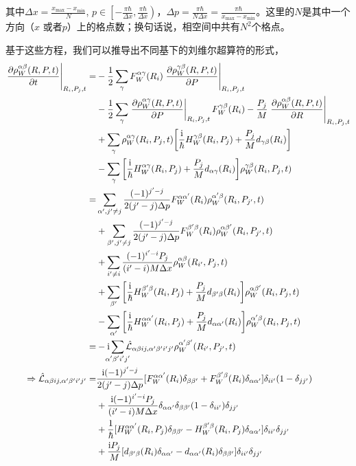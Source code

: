 \documentclass[UTF8,12pt]{article}
\begin{document}
        其中$\Delta x=\frac{x_{\max}-x_{\min}}{N}$, $p\in\left[-\frac{\pi\hbar}{\Delta x},\frac{\pi\hbar}{\Delta x}\right)$，$\Delta p=\frac{\pi\hbar}{N\Delta x}=\frac{\pi\hbar}{x_{\max}-x_{\min}}$。这里的$N$是其中一个方向（$x$ 或者$p$）上的格点数；换句话说，相空间中共有$N^2$个格点。\par
        基于这些方程，我们可以推导出不同基下的刘维尔超算符的形式，
        \begin{align}
            \eval{\pdv{\rho_W^{\alpha\beta}(R,P,t)}{t}}_{R_i,P_j,t}=&-\frac{1}{2}\sum_{\gamma}{F_W^{\alpha\gamma}(R_i)\eval{\pdv{\rho_W^{\gamma\beta}(R,P,t)}{P}}_{R_i,P_j,t}} \nonumber \\
            &-\frac{1}{2}\sum_{\gamma}{\eval{\pdv{\rho_W^{\alpha\gamma}(R,P,t)}{P}}_{R_i,P_j,t}F_W^{\gamma\beta}(R_i)}-\frac{P_j}{M}\eval{\pdv{\rho_W^{\alpha\beta}(R,P,t)}{R}}_{R_i,P_j,t} \nonumber \\
            &+\sum_{\gamma}{\rho_W^{\alpha\gamma}(R_i,P_j,t)\qty[\frac{\mathrm{i}}{\hbar}H_W^{\gamma\beta}(R_i,P_j)+\frac{P_j}{M}d_{\gamma\beta}(R_i)]} \nonumber \\
            &-\sum_{\gamma}{\qty[\frac{\mathrm{i}}{\hbar}H_W^{\alpha\gamma}(R_i,P_j)+\frac{P_j}{M}d_{\alpha\gamma}(R_i)]\rho_W^{\gamma\beta}(R_i,P_j,t)} \\
            =&\sum_{\alpha', j'\neq j}{\frac{(-1)^{j'-j}}{2(j'-j)\Delta p}F_W^{\alpha\alpha'}(R_i)\rho_W^{\alpha'\beta}(R_i,P_{j'},t)} \nonumber \\
            &+\sum_{\beta',j'\neq j}{\frac{(-1)^{j'-j}}{2(j'-j)\Delta p}F_W^{\beta'\beta}(R_i)\rho_W^{\alpha\beta'}(R_i,P_{j'},t)} \nonumber \\
            &+\sum_{i'\neq i}{\frac{(-1)^{i'-i}P_j}{(i'-i)M\Delta x}\rho_W^{\alpha\beta}(R_{i'},P_j,t)} \nonumber \\
            &+\sum_{\beta'}{\qty[\frac{\mathrm{i}}{\hbar}H_W^{\beta'\beta}(R_i,P_j)+\frac{P_j}{M}d_{\beta'\beta}(R_i)]\rho_W^{\alpha\beta'}(R_i,P_j,t)} \nonumber \\
            &-\sum_{\alpha'}{\qty[\frac{\mathrm{i}}{\hbar}H_W^{\alpha\alpha'}(R_i,P_j)+\frac{P_j}{M}d_{\alpha\alpha'}(R_i)]\rho_W^{\alpha'\beta}(R_i,P_j,t)} \\
            =&-\mathrm{i}\sum_{\mathclap{\alpha'\beta'i'j'}}{\hat{\mathcal{L}}_{\alpha\beta ij,\alpha'\beta'i'j'}\rho_W^{\alpha'\beta'}(R_{i'},P_{j'},t)} \\
            \Rightarrow\hat{\mathcal{L}}_{\alpha\beta ij,\alpha'\beta'i'j'}=&\frac{\mathrm{i}(-1)^{j'-j}}{2(j'-j)\Delta p}[F_W^{\alpha\alpha'}(R_i)\delta_{\beta\beta'}+F_W^{\beta'\beta}(R_i)\delta_{\alpha\alpha'}]\delta_{ii'}(1-\delta_{jj'}) \nonumber \\
            &+\frac{\mathrm{i}(-1)^{i'-i}P_j}{(i'-i)M\Delta x}\delta_{\alpha\alpha'}\delta_{\beta\beta'}(1-\delta_{ii'})\delta_{jj'} \nonumber \\
            &+\frac{1}{\hbar}[H_W^{\alpha\alpha'}(R_i,P_j)\delta_{\beta\beta'}-H_W^{\beta'\beta}(R_i,P_j)\delta_{\alpha\alpha'}]\delta_{ii'}\delta_{jj'} \nonumber \\
            &+\frac{\mathrm{i}P_j}{M}[d_{\beta'\beta}(R_i)\delta_{\alpha\alpha'}-d_{\alpha\alpha'}(R_i)\delta_{\beta\beta'}]\delta_{ii'}\delta_{jj'}
        \end{align}
\end{document}
